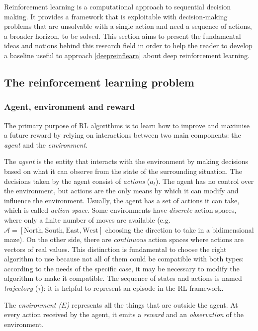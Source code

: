 Reinforcement learning is a computational approach to sequential decision making. It provides a framework that is exploitable with decision-making problems that are unsolvable with a single action and need a sequence of actions, a broader horizon, to be solved. 
This section aims to present the fundamental ideas and notions behind this research field in order to help the reader to develop a baseline useful to approach \vref{deepreinflearn} about deep reinforcement learning.

\subsection{The reinforcement learning problem}

\subsubsection{Agent, environment and reward}

The primary purpose of RL algorithms is to learn how to improve and maximise a future reward by relying on interactions between two main components: the \textit{agent} and the \textit{environment}. 

The \textit{agent} is the entity that interacts with the environment by making decisions based on what it can observe from the state of the surrounding situation. The decisions taken by the agent consist of \textit{actions} ($a_t$).  The agent has no control over the environment, but actions are the only means by which it can modify and influence the environment.
Usually, the agent has a set of actions it can take, which is called \textit{action space}.
Some environments have \textit{discrete} action spaces, where only a finite number of moves are available (e.g. $\mathcal{A} = [\text{North}, \text{South}, \text{East}, \text{West}]$ choosing the direction to take in a bidimensional maze). On the other side, there are \textit{continuous} action spaces where actions are vectors of real values.
This distinction is fundamental to choose the right algorithm to use because not all of them could be compatible with both types: according to the needs of the specific case, it may be necessary to modify the algorithm to make it compatible. The sequence of states and actions is named \textit{trajectory} ($\tau$): it is helpful to represent an episode in the RL framework.

The \textit{environment ($E$)} represents all the things that are outside the agent. At every action received by the agent, it emits a \textit{reward} and an \textit{observation} of the environment.

